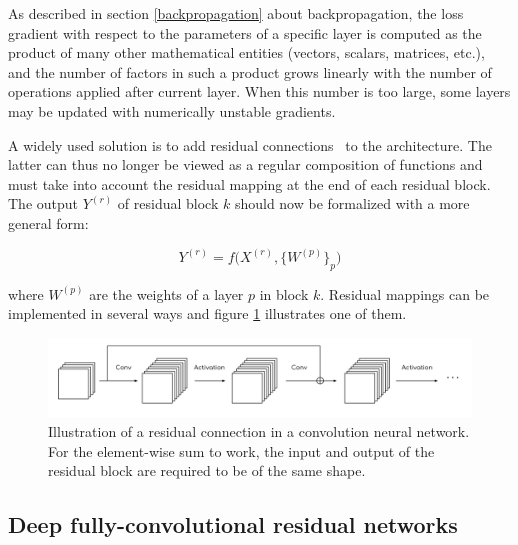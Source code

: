         As described in section \ref{backpropagation} about backpropagation,
        the loss gradient with respect to the parameters of a specific layer
        is computed as the product of many other mathematical entities
        (vectors, scalars, matrices, etc.), and the number of factors in such
        a product grows linearly with the number of operations applied after
        current layer. When this number is too large, some layers may be
        updated with numerically unstable gradients.

        A widely used solution is to add
        residual connections~\cite{DBLP:journals/corr/HeZRS15}
        to the architecture. The latter can thus no longer be viewed as
        a regular composition of functions and must take into account
        the residual mapping at the end of each residual block.
        The output $Y^{(r)}$ of residual block $k$ should now
        be formalized with a more general form:

        \begin{equation}
            Y^{(r)} = f\big(X^{(r)}, \{W^{(p)}\}_p\big)
        \end{equation}

        where $W^{(p)}$ are the weights of a layer $p$ in block $k$.
        Residual mappings can be implemented in several ways and figure \ref{resnet}
        illustrates one of them.

        \begin{figure}[H]
            \begin{center}
                \includegraphics[width=\textwidth, keepaspectratio]{imgs/resnet.png}
                \caption{Illustration of a residual connection in a convolution
                neural network. For the element-wise sum to work, the input and output
                of the residual block are required to be of the same shape.}
                \label{resnet}
            \end{center}
        \end{figure}

    \subsection{Deep fully-convolutional residual networks}

